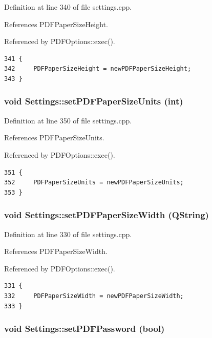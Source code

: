 Definition at line 340 of file settings.cpp.

References PDFPaper\-Size\-Height.

Referenced by PDFOptions::exec().

\footnotesize\begin{verbatim}341 {
342     PDFPaperSizeHeight = newPDFPaperSizeHeight;
343 }
\end{verbatim}\normalsize 


\hypertarget{classSettings_a45}{
\subsubsection[setPDFPaperSizeUnits]{\setlength{\rightskip}{0pt plus 5cm}void Settings::set\-PDFPaper\-Size\-Units (int)}}
\label{classSettings_a45}


Definition at line 350 of file settings.cpp.

References PDFPaper\-Size\-Units.

Referenced by PDFOptions::exec().

\footnotesize\begin{verbatim}351 {
352     PDFPaperSizeUnits = newPDFPaperSizeUnits;
353 }
\end{verbatim}\normalsize 


\hypertarget{classSettings_a41}{
\subsubsection[setPDFPaperSizeWidth]{\setlength{\rightskip}{0pt plus 5cm}void Settings::set\-PDFPaper\-Size\-Width (QString)}}
\label{classSettings_a41}


Definition at line 330 of file settings.cpp.

References PDFPaper\-Size\-Width.

Referenced by PDFOptions::exec().

\footnotesize\begin{verbatim}331 {
332     PDFPaperSizeWidth = newPDFPaperSizeWidth;
333 }
\end{verbatim}\normalsize 


\hypertarget{classSettings_a48}{
\subsubsection[setPDFPassword]{\setlength{\rightskip}{0pt plus 5cm}void Settings::set\-PDFPassword (bool)}}
\label{classSettings_a48}


